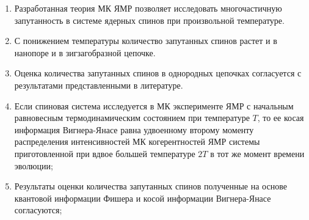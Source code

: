 \begin{enumerate}
  \item
  Разработанная теория МК ЯМР позволяет исследовать многочастичную запутанность в системе ядерных спинов при произвольной температуре.

  \item
  С понижением температуры количество запутанных спинов растет и в нанопоре и в зигзагобразной цепочке. 
  
  \item
  Оценка количества запутанных спинов в однородных цепочках согласуется с результатами представленными в литературе.

  \item
  Если спиновая система исследуется в МК эксперименте ЯМР с начальным равновесным термодинамическим состоянием при температуре $T$, 
  то ее косая информация Вигнера-Янасе равна удвоенному второму моменту распределения интенсивностей МК когерентностей ЯМР системы приготовленной при вдвое большей температуре $2T$ в тот же момент времени эволюции;

  \item
  Результаты оценки количества запутанных спинов полученные на основе квантовой информации Фишера и косой информации Вигнера-Янасе согласуются;
\end{enumerate}
